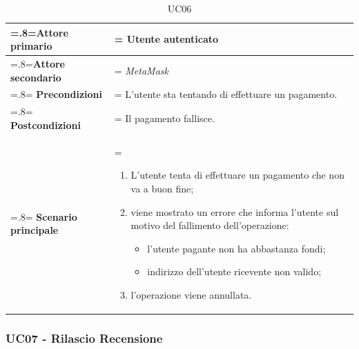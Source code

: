                 \begin{table}[H]
                    \centering
                    \renewcommand{\arraystretch}{1.8}
                    \renewcommand\tabularxcolumn[1]{m{#1}}
                    \begin{tabularx}{0.9\textwidth} {
                        >{\hsize=.8\hsize\linewidth=\hsize}X
                        >{\hsize=1.2\hsize\linewidth=\hsize}X}
                        \hline
                        \textbf{Attore primario} & Utente autenticato \\
                        \hline
                        \textbf{Attore secondario} & \textit{MetaMask} \\
                        \hline
                        \textbf{Precondizioni} & L'utente sta tentando di effettuare un pagamento. \\
                        \hline
                        \textbf{Postcondizioni} & Il pagamento fallisce. \\
                        \hline
                        \textbf{Scenario principale} &
                        \begin{enumerate}
                            \item L'utente tenta di effettuare un pagamento che non va a buon fine;
                            \item viene mostrato un errore che informa l'utente sul motivo del fallimento dell'operazione:
                            \begin{itemize}
                                \item l'utente pagante non ha abbastanza fondi;
                                \item indirizzo dell'utente ricevente non valido;
                            \end{itemize}
                            \item l'operazione viene annullata.
                        \end{enumerate} \\
                        \hline
                    \end{tabularx}
                    \caption{UC06}
                \end{table}

        \subsubsection{UC07 - Rilascio Recensione}
        \label{UC07}

